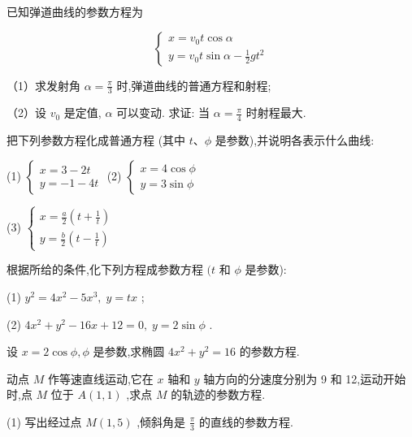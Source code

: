 \documentclass[lang=cn,newtx,10pt,scheme=chinese]{elegantbook}
\begin{document}
\begin{problemset}[习 题 十 三]

\item 已知弹道曲线的参数方程为

\[
  \left\{ \begin{array}{l} x = {v}_{0}t\cos \alpha \\ y = {v}_{0}t\sin \alpha - \frac{1}{2}g{t}^{2} \end{array}\right.
\]

（1）求发射角 \(\alpha = \frac{\pi }{3}\) 时,弹道曲线的普通方程和射程;

（2）设 \({v}_{0}\) 是定值, \(\alpha\) 可以变动. 求证: 当 \(\alpha = \frac{\pi }{4}\) 时射程最大.

\item 把下列参数方程化成普通方程 (其中 \(t\text{、}\phi\) 是参数),并说明各表示什么曲线:

(1) \(\left\{ \begin{array}{l} x = 3 - {2t} \\ y = - 1 - {4t} \end{array}\right.\) (2) \(\left\{ \begin{array}{l} x = 4\cos \phi \\ y = 3\sin \phi \end{array}\right.\)

(3) \(\left\{ \begin{array}{l} x = \frac{a}{2}\left( {t + \frac{1}{t}}\right) \\ y = \frac{b}{2}\left( {t - \frac{1}{t}}\right) \end{array}\right.\)

\item 根据所给的条件,化下列方程成参数方程 \((t\) 和 \(\phi\) 是参数):

(1) \({y}^{2} = 4{x}^{2} - 5{x}^{3},\;y = {tx}\) ;

(2) \(4{x}^{2} + {y}^{2} - {16x} + {12} = 0,\;y = 2\sin \phi\) .

\item 设 \(x = 2\cos \phi ,\phi\) 是参数,求椭圆 \(4{x}^{2} + {y}^{2} = {16}\) 的参数方程.

\item 动点 \(M\) 作等速直线运动,它在 \(x\) 轴和 \(y\) 轴方向的分速度分别为 9 和 12,运动开始时,点 \(M\) 位于 \(A\left( {1,1}\right)\) ,求点 \(M\) 的轨迹的参数方程.

\item (1) 写出经过点 \(M\left( {1,5}\right)\) ,倾斜角是 \(\frac{\pi }{3}\) 的直线的参数方程.


\end{problemset}
\end{document}
